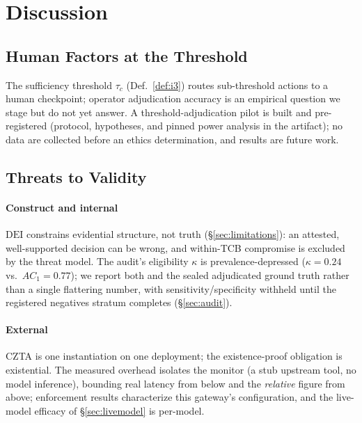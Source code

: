 \documentclass[conference]{IEEEtran}
\newcommand{\DEI}{\ensuremath{\mathrm{DEI}}}
\begin{document}
\section{Discussion}

\subsection{Human Factors at the Threshold}
\label{sec:human}
The sufficiency threshold $\tau_c$ (Def.~\ref{def:i3}) routes
sub-threshold actions to a human checkpoint; operator adjudication
accuracy is an empirical question we stage but do not yet answer. A
threshold-adjudication pilot is built and pre-registered (protocol,
hypotheses, and pinned power analysis in the artifact); no data are
collected before an ethics determination, and results are future work.


\subsection{Threats to Validity}
\label{sec:threats}
\paragraph*{Construct and internal}
\DEI{} constrains evidential structure, not truth
(\S\ref{sec:limitations}): an attested, well-supported decision
can be wrong, and within-TCB compromise is excluded by the threat
model. The audit's eligibility $\kappa$ is prevalence-depressed
($\kappa = 0.24$ vs.\ $AC_1 = 0.77$); we report both and the sealed
adjudicated ground truth rather than a single flattering number,
with sensitivity/specificity withheld until the registered
negatives stratum completes (\S\ref{sec:audit}).
\paragraph*{External}
CZTA is one instantiation on one deployment; the existence-proof
obligation is existential. The measured overhead isolates the
monitor (a stub upstream tool, no model inference), bounding real
latency from below and the \emph{relative} figure from above;
enforcement results characterize this gateway's configuration, and
the live-model efficacy of \S\ref{sec:livemodel} is per-model.
\end{document}

